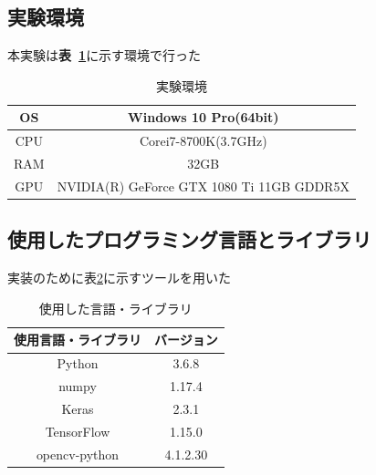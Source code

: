 \documentclass[a4j, 11pt]{jreport}
\newcommand{\tabref}[1]{\textbf{表~\ref{#1}}}
\begin{document}
\subsection{実験環境}
本実験は\tabref{spec}に示す環境で行った
\begin{table}[H]
	\caption{実験環境}
	\centering
	\label{spec}
	\begin{tabular}{|c|c|}
	\hline
	OS  & Windows 10 Pro(64bit)                      \\ \hline
	CPU & Corei7-8700K(3.7GHz)                       \\ \hline
	RAM & 32GB                                       \\ \hline
	GPU & NVIDIA(R) GeForce  GTX 1080 Ti 11GB GDDR5X \\ \hline
	
\end{tabular}

\end{table}
\subsection{使用したプログラミング言語とライブラリ}
実装のために表\ref{tb:environment}に示すツールを用いた
\begin{table}[H]
	\caption{使用した言語・ライブラリ}
	\label{tb:environment}
	\centering
	\begin{tabular}{cc}
	\hline
	\multicolumn{1}{|c}{使用言語・ライブラリ}    & \multicolumn{1}{c|}{バージョン}    \\ \hline \hline
	\multicolumn{1}{|c}{Python}        & \multicolumn{1}{c|}{3.6.8}    \\ \hline
	\multicolumn{1}{|c}{numpy}         & \multicolumn{1}{c|}{1.17.4}   \\ \hline
	\multicolumn{1}{|c}{Keras}         & \multicolumn{1}{c|}{2.3.1}    \\ \hline
	\multicolumn{1}{|c}{TensorFlow}    & \multicolumn{1}{c|}{1.15.0}   \\ \hline
	\multicolumn{1}{|c}{opencv-python} & \multicolumn{1}{c|}{4.1.2.30} \\ \hline
	\end{tabular}
\end{table}
\end{document}
